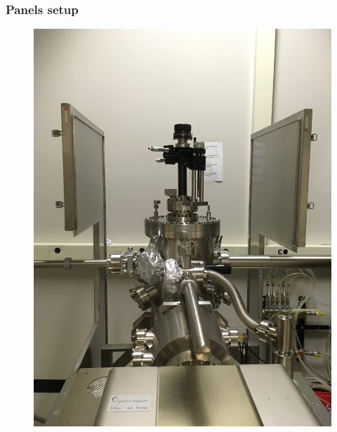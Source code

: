 \begin{enumerate}
\subsubsection*{Panels setup}

\begin{figure}[H]	\vfill
	\begin{minipage}[c]{0.33\linewidth}  %
		\centering
		\includegraphics[width=1\textwidth, angle=270]{panels1.jpg} %
	\end{minipage}\hfill
	\begin{minipage}[c]{0.33\linewidth}
		\centering

\end{minipage}
\end{figure}
\end{enumerate}

